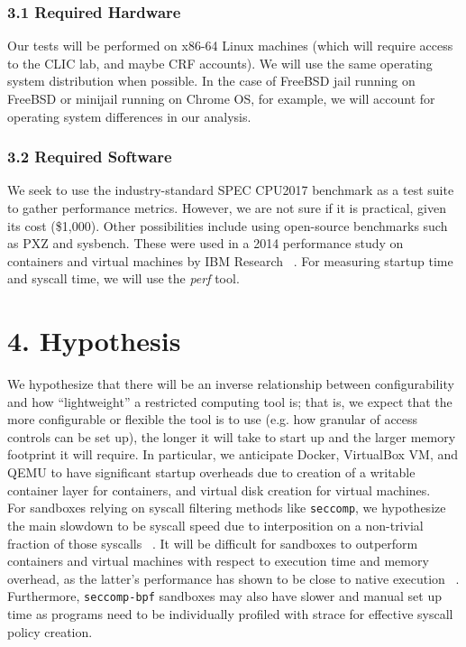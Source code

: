 \documentclass{proc}
\begin{document}
\subsubsection*{3.1 Required Hardware}
Our tests will be performed on x86-64 Linux machines (which will require access to the CLIC lab, and maybe CRF accounts). We will use the same operating system distribution when possible. In the case of FreeBSD jail running on FreeBSD or minijail running on Chrome OS, for example, we will account for operating system differences in our analysis.
\subsubsection*{3.2 Required Software}
We seek to use the industry-standard SPEC CPU2017 benchmark \cite{limaye2018spec} as a test suite to gather performance metrics. However, we are not sure if it is practical, given its cost (\$1,000). Other possibilities include using open-source benchmarks such as PXZ and sysbench. These were used in a 2014 performance study on containers and virtual machines by IBM Research ~\cite{felter2014docker}. For measuring startup time and syscall time, we will use the \emph{perf} tool.
\section*{4. Hypothesis}
We hypothesize that there will be an inverse relationship between configurability and how ``lightweight'' a restricted computing tool is; that is, we expect that the more configurable or flexible the tool is to use (e.g. how granular of access controls can be set up), the longer it will take to start up and the larger memory footprint it will require. In particular, we anticipate Docker, VirtualBox VM, and QEMU to have significant startup overheads due to creation of a writable container layer for containers, and virtual disk creation for virtual machines.\\

For sandboxes relying on syscall filtering methods like \texttt{seccomp}, we hypothesize the main slowdown to be syscall speed due to interposition on a non-trivial fraction of those syscalls ~\cite{kim2013mbox}. It will be difficult for sandboxes to outperform containers and virtual machines with respect to execution time and memory overhead, as the latter's performance has shown to be close to native execution ~\cite{felter2014docker}. Furthermore, \texttt{seccomp-bpf} sandboxes may also have slower and manual set up time as programs need to be individually profiled with strace for effective syscall policy creation.
\end{document}
